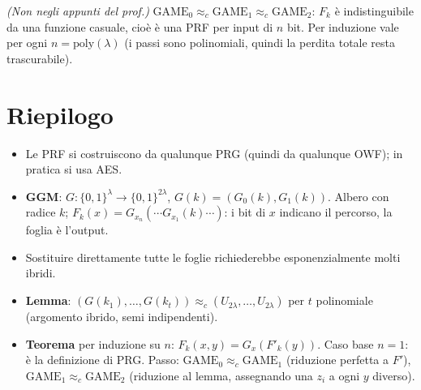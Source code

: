 \emph{(Non negli appunti del prof.)} \(\text{GAME}_0 \approx_c \text{GAME}_1 \approx_c \text{GAME}_2\): \(F_k\) è indistinguibile da una funzione casuale, cioè è una PRF per input di \(n\) bit. Per induzione vale per ogni \(n = \text{poly}(\lambda)\) (i passi sono polinomiali, quindi la perdita totale resta trascurabile).

\section{Riepilogo}

\begin{itemize}
  \item Le PRF si costruiscono da qualunque PRG (quindi da qualunque OWF); in pratica si usa AES.
  \item \textbf{GGM}: \(G : \{0,1\}^\lambda \to \{0,1\}^{2\lambda}\), \(G(k) = (G_0(k), G_1(k))\). Albero con radice \(k\); \(F_k(x) = G_{x_n}(\cdots G_{x_1}(k) \cdots)\): i bit di \(x\) indicano il percorso, la foglia è l'output.
  \item Sostituire direttamente tutte le foglie richiederebbe esponenzialmente molti ibridi.
  \item \textbf{Lemma}: \((G(k_1), \dots, G(k_t)) \approx_c (U_{2\lambda}, \dots, U_{2\lambda})\) per \(t\) polinomiale (argomento ibrido, semi indipendenti).
  \item \textbf{Teorema} per induzione su \(n\): \(F_k(x, y) = G_x(F'_k(y))\). Caso base \(n = 1\): è la definizione di PRG. Passo: \(\text{GAME}_0 \approx_c \text{GAME}_1\) (riduzione perfetta a \(F'\)), \(\text{GAME}_1 \approx_c \text{GAME}_2\) (riduzione al lemma, assegnando una \(z_i\) a ogni \(y\) diverso).
\end{itemize}
